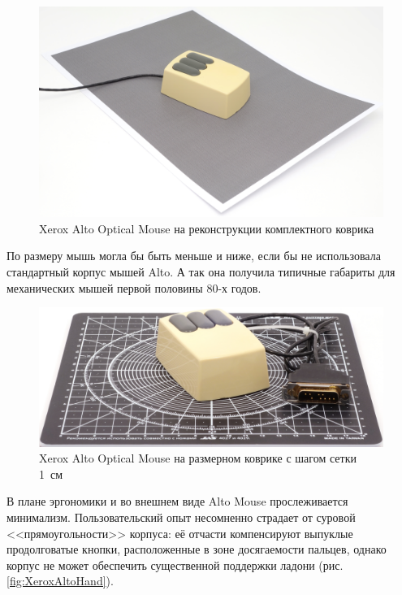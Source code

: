 \documentclass[11pt, a4paper]{article}
\begin{document}
\begin{figure}[h]
    \centering
    \includegraphics[scale=0.3]{1981_xerox_alto_mouse/pad_30.jpg}
    \caption{Xerox Alto Optical Mouse на реконструкции комплектного коврика}
    \label{fig:XeroxAltoPad}
\end{figure}

По размеру мышь могла бы быть меньше и ниже, если бы не использовала стандартный корпус мышей Alto. А так она получила типичные габариты для механических мышей  первой половины 80-х годов.

\begin{figure}[h]
    \centering
    \includegraphics[scale=0.4]{1981_xerox_alto_mouse/size_15.jpg}
    \caption{Xerox Alto Optical Mouse на размерном коврике с шагом сетки 1~см}
    \label{fig:XeroxAltoSize}
\end{figure}

В плане эргономики и во внешнем виде Alto Mouse прослеживается минимализм. Пользовательский опыт несомненно страдает от суровой <<прямоугольности>> корпуса: её отчасти компенсируют выпуклые продолговатые кнопки, расположенные в зоне досягаемости пальцев, однако корпус не может обеспечить существенной поддержки ладони (рис. \ref{fig:XeroxAltoHand}).
\end{document}
